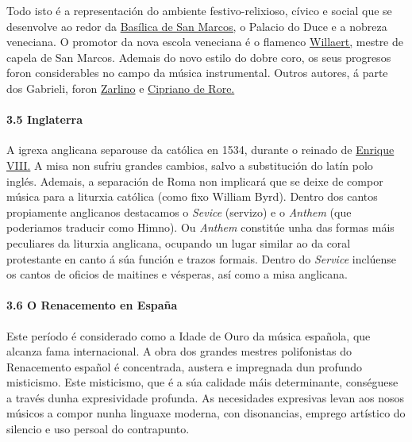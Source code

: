 \documentclass[
]{article}
\begin{document}
Todo isto é a representación do ambiente festivo-relixioso, cívico e
social que se desenvolve ao redor da
\href{http://es.wikipedia.org/wiki/Bas\%C3\%ADlica_de_San_Marcos}{Basílica
de San Marcos,} o Palacio do Duce e a nobreza veneciana. O promotor da
nova escola veneciana é o flamenco
\href{http://es.wikipedia.org/wiki/Adrian_Willaert}{Willaert,} mestre de
capela de San Marcos. Ademais do novo estilo do dobre coro, os seus
progresos foron considerables no campo da música instrumental. Outros
autores, á parte dos Gabrieli, foron
\href{http://es.wikipedia.org/wiki/Gioseffo_Zarlino}{Zarlino} e
\href{http://es.wikipedia.org/wiki/Cipriano_de_Rore}{Cipriano de Rore.}

\hypertarget{35-inglaterra}{%
\paragraph{\texorpdfstring{\textbf{3.5
Inglaterra}}{3.5 Inglaterra}}\label{35-inglaterra}}

A igrexa anglicana separouse da católica en 1534, durante o reinado de
\href{http://es.wikipedia.org/wiki/Enrique_VIII_de_Inglaterra}{Enrique
VIII.} A misa non sufriu grandes cambios, salvo a substitución do latín
polo inglés. Ademais, a separación de Roma non implicará que se deixe de
compor música para a liturxia católica (como fixo William Byrd). Dentro
dos cantos propiamente anglicanos destacamos o \emph{Sevice} (servizo) e
o \emph{Anthem} (que poderiamos traducir como Himno). Ou \emph{Anthem}
constitúe unha das formas máis peculiares da liturxia anglicana,
ocupando un lugar similar ao da coral protestante en canto á súa función
e trazos formais. Dentro do \emph{Service} inclúense os cantos de
oficios de maitines e vésperas, así como a misa anglicana.

\hypertarget{36-o-renacemento-en-espauxf1a}{%
\paragraph{\texorpdfstring{\textbf{3.6 O Renacemento en
España}}{3.6 O Renacemento en España}}\label{36-o-renacemento-en-espauxf1a}}

Este período é considerado como a Idade de Ouro da música española, que
alcanza fama internacional. A obra dos grandes mestres polifonistas do
Renacemento español é concentrada, austera e impregnada dun profundo
misticismo. Este misticismo, que é a súa calidade máis determinante,
conséguese a través dunha expresividade profunda. As necesidades
expresivas levan aos nosos músicos a compor nunha linguaxe moderna, con
disonancias, emprego artístico do silencio e uso persoal do contrapunto.
\end{document}
